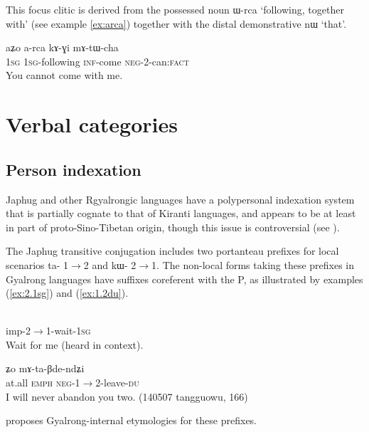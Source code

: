 \documentclass[oldfontcommands,oneside,a4paper,11pt]{article}
\newcommand{\ipa}[1]{{\phon #1}} %
\begin{document}
This focus clitic is derived from the possessed noun  \ipa{ɯ-rca} `following, together with' (see example \ref{ex:arca}) together with the distal demonstrative \ipa{nɯ} `that'.

\begin{exe}
\ex \label{ex:arca}
\gll
\ipa{aʑo} 	\ipa{a-rca} 	\ipa{kɤ-ɣi} 	\ipa{mɤ-tɯ-cha} \\
\textsc{1sg} \textsc{1sg}-following \textsc{inf}-come \textsc{neg}-2-can:\textsc{fact} \\
\glt You cannot come with me.
\end{exe}
 
 

  \section{Verbal categories} 

\subsection{Person indexation} 
Japhug and other Rgyalrongic languages have a polypersonal indexation system that is partially cognate to that of Kiranti languages, and appears to be at least in part of proto-Sino-Tibetan origin, though this issue is controversial (see \citealt{delancey11prefixes, jacques12agreement}).

The Japhug transitive conjugation includes two portanteau prefixes for local scenarios \ipa{ta-} 1$\rightarrow$2 and \ipa{kɯ-} 2$\rightarrow$1.  The non-local forms taking these prefixes in Gyalrong languages have suffixes coreferent with the P, as illustrated by examples (\ref{ex:2.1sg}) and (\ref{ex:1.2du}).

\begin{exe}
\ex \label{ex:2.1sg}
\gll \ipa{pɯ-kɯ-nɤjo-a} \\
imp-2$\rightarrow$1-wait-\textsc{1sg} \\
\glt Wait for me (heard in context).
\end{exe}

\begin{exe}
\ex \label{ex:1.2du}
\gll  \ipa{maka} 	\ipa{ʑo} 	\ipa{mɤ-ta-βde-ndʑi} \\
at.all \textsc{emph} \textsc{neg}-1$\rightarrow$2-leave-\textsc{du} \\
\glt I will never abandon you two. (140507 tangguowu, 166)
\end{exe}

\citet{jacques15generic}  proposes Gyalrong-internal etymologies for these prefixes. 
\end{document}
